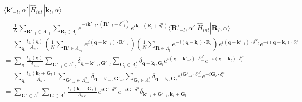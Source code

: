 \documentclass[hyperref,a4paper,UTF8]{ctexart}
\begin{document}
$$\begin{aligned} & \langle \mathbf{k}'_{-l}, \alpha' | \hat{H}_{int} | \mathbf{k}_{l}, \alpha \rangle \\ & = \frac{1}{N} \sum_{\mathbf{R}'_{-l} \in \Lambda_{-l}} \sum_{\mathbf{R}_l \in \Lambda_l} e^{-i \mathbf{k}'_{-l} \cdot (\mathbf{R}'_{-l} + \delta^{\alpha'}_{-l})} e^{i \mathbf{k}_l \cdot (\mathbf{R}_l + \delta^\alpha_l)} \langle \mathbf{R}'_{-l}, \alpha' |\hat{H}_{int} | \mathbf{R}_l, \alpha \rangle \\ & = \sum_{\mathbf{q}} \frac{t_\perp (\mathbf{q})}{A_{u.c.}} \left( \frac{1}{N} \sum_{\mathbf{R}' \in \Lambda_{-l}} e^{i (\mathbf{q} - \mathbf{k}'_{-l}) \cdot \mathbf{R}'_{-l}} \right) \left( \frac{1}{N} \sum_{\mathbf{R} \in \Lambda_l} e^{- i (\mathbf{q} - \mathbf{k}_l) \cdot \mathbf{R}_l} \right) e^{i (\mathbf{q} - \mathbf{k}'_{-l}) \cdot \delta^{\alpha'}_{-l}} e^{-i (\mathbf{q} - \mathbf{k}_l) \cdot \delta^{\alpha}_l} \\ & = \sum_{\mathbf{q}} \frac{t_\perp (\mathbf{q})}{A_{u.c.}} \sum_{\mathbf{G}'_{-l} \in \Lambda^*_{-l}} \delta_{\mathbf{q} - \mathbf{k}'_{-l},\mathbf{G}'_{-l}} \sum_{\mathbf{G}_l \in \Lambda^*_{l}} \delta_{\mathbf{q} - \mathbf{k}_l,\mathbf{G}_l} e^{i (\mathbf{q} - \mathbf{k}'_{-l}) \cdot \delta^{\alpha'}_{-l}} e^{-i (\mathbf{q} - \mathbf{k}_l) \cdot \delta^{\alpha}_l} \\ & = \sum_{\mathbf{q}} \frac{t_\perp (\mathbf{k}_l + \mathbf{G}_l)}{A_{u.c.}} \sum_{\mathbf{G}'_{-l} \in \Lambda^*_{-l}} \delta_{\mathbf{q} - \mathbf{k}'_{-l},\mathbf{G}'_{-l}} \sum_{\mathbf{G}_l \in \Lambda^*_{l}} \delta_{\mathbf{q} - \mathbf{k}_l,\mathbf{G}_l} e^{i \mathbf{G}'_{-l} \cdot \delta^{\alpha'}_{-l}} e^{-i \mathbf{G}_l \cdot \delta^{\alpha}_l} \\ & = \sum_{\mathbf{G}' \in \Lambda^*} \sum_{\mathbf{G} \in \Lambda^*} \frac{t_\perp (\mathbf{k}_l + \mathbf{G}_l)}{A_{u.c.}} e^{i \mathbf{G}' \cdot \delta^{\alpha'}} e^{-i \mathbf{G} \cdot \delta^{\alpha}} \delta_{\mathbf{k}'_{-l} + \mathbf{G}'_{-l} , \mathbf{k}_l + \mathbf{G}_l} \end{aligned}$$
\
\end{document}
